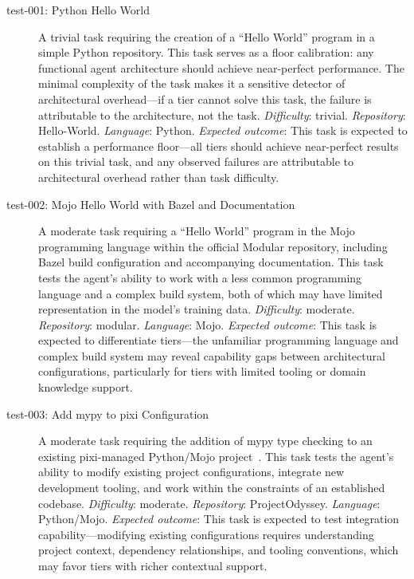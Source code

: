 \documentclass[11pt]{article}
\begin{document}
\begin{description}
  \item[test-001: Python Hello World] A trivial task requiring the creation of
    a ``Hello World'' program in a simple Python repository. This task serves
    as a floor calibration: any functional agent architecture should achieve
    near-perfect performance. The minimal complexity of the task makes it
    a sensitive detector of architectural overhead---if a tier cannot solve
    this task, the failure is attributable to the architecture, not the task.
    \emph{Difficulty}: trivial. \emph{Repository}: Hello-World.
    \emph{Language}: Python.
    \emph{Expected outcome}: This task is expected to establish a performance
    floor---all tiers should achieve near-perfect results on this trivial task,
    and any observed failures are attributable to architectural overhead rather
    than task difficulty.
  \item[test-002: Mojo Hello World with Bazel and Documentation] A moderate
    task requiring a ``Hello World'' program in the Mojo programming language
    within the official Modular repository, including Bazel build configuration and
    accompanying documentation. This task tests the agent's ability to work
    with a less common programming language and a complex build system, both
    of which may have limited representation in the model's training data.
    \emph{Difficulty}: moderate. \emph{Repository}: modular.
    \emph{Language}: Mojo.
    \emph{Expected outcome}: This task is expected to differentiate tiers---the
    unfamiliar programming language and complex build system may reveal
    capability gaps between architectural configurations, particularly for
    tiers with limited tooling or domain knowledge support.
  \item[test-003: Add mypy to pixi Configuration] A moderate task requiring the
    addition of mypy type checking to an existing pixi-managed Python/Mojo
    project~\cite{projectodyssey}. This task tests the agent's ability to
    modify existing project configurations, integrate new development tooling,
    and work within the constraints of an established codebase.
    \emph{Difficulty}: moderate. \emph{Repository}: ProjectOdyssey.
    \emph{Language}: Python/Mojo.
    \emph{Expected outcome}: This task is expected to test integration
    capability---modifying existing configurations requires understanding
    project context, dependency relationships, and tooling conventions, which
    may favor tiers with richer contextual support.
\end{description}
\end{document}
